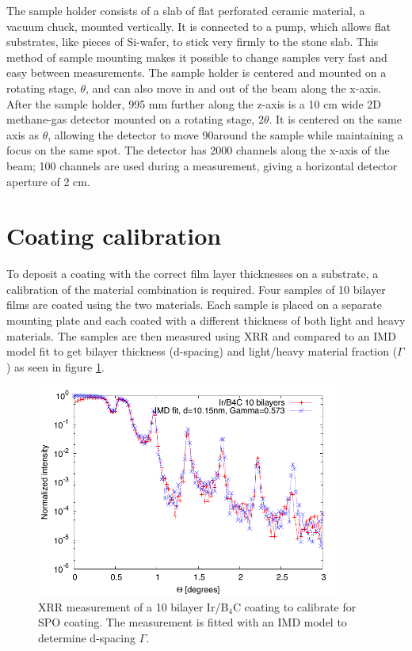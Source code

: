 The sample holder consists of a slab of flat perforated ceramic material, a vacuum chuck, mounted vertically. It is connected to a pump, which allows flat substrates, like pieces of Si-wafer, to stick very firmly to the stone slab. This method of sample mounting makes it possible to change samples very fast and easy between measurements. The sample holder is centered and mounted on a rotating stage, $\theta$, and can also move in and out of the beam along the x-axis.\\
After the sample holder, 995 mm further along the z-axis is a 10 cm wide 2D methane-gas detector mounted on a rotating stage, $2\theta$. It is centered on the same axis as $\theta$, allowing the detector to move 90\degr around the sample while maintaining a focus on the same spot. The detector has 2000 channels along the x-axis of the beam; 100 channels are used during a measurement, giving a horizontal detector aperture of 2 cm.

\section{Coating calibration}\label{sec:coating_calib}
To deposit a coating with the correct film layer thicknesses on a substrate, a calibration of the material combination is required. Four samples of 10 bilayer films are coated using the two materials. Each sample is placed on a separate mounting plate and each coated with a different thickness of both light and heavy materials. The samples are then measured using XRR and compared to an IMD\cite{Windt:1998tb} model fit to get bilayer thickness (d-spacing) and light/heavy material fraction ($\Gamma$) as seen in figure \ref{fig:irb4c-fit}.

\begin{figure}[!h]
  \center
  \includegraphics[height=7cm]{figures/chamber/si5811-fit.pdf}
\caption{\footnotesize XRR measurement of a 10 bilayer Ir/B$_4$C coating to calibrate for SPO coating. The measurement is fitted with an IMD model to determine d-spacing $\Gamma$.}\label{fig:irb4c-fit}
\end{figure}

